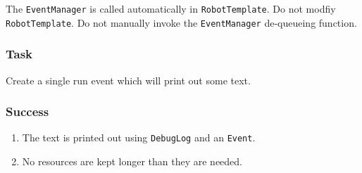 \documentclass[a4paper]{article}
\begin{document}
The \lstinline{EventManager} is called automatically in \lstinline{RobotTemplate}. Do not modfiy \lstinline{RobotTemplate}. Do not manually invoke the \lstinline{EventManager} de-queueing function.
\subsubsection{Task} Create a single run event which will print out some text.
\subsubsection{Success} \begin{enumerate}\item{The text is printed out using \lstinline{DebugLog} and an \lstinline{Event}.}\item{No resources are kept longer than they are needed.}\end{enumerate}
\end{document}
